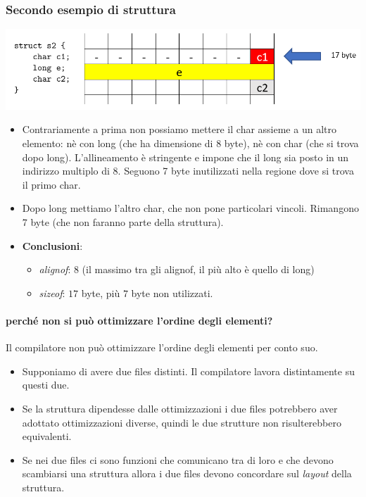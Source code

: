 			\subsubsection{Secondo esempio di struttura}
			\begin{center}
				\includegraphics[scale=0.80]{img/17.PNG}
			\end{center} 
			\begin{itemize}
				\item Contrariamente a prima non possiamo mettere il char assieme a un altro elemento: nè con long (che ha dimensione di 8 byte), nè con char (che si trova dopo long). L'allineamento è stringente e impone che il long sia posto in un indirizzo multiplo di 8. Seguono 7 byte inutilizzati nella regione dove si trova il primo char.
				\item Dopo long mettiamo l'altro char, che non pone particolari vincoli. Rimangono 7 byte (che non faranno parte della struttura).
				\item \textbf{Conclusioni}:\begin{itemize}
					\item \emph{alignof}: $8$ (il massimo tra gli alignof, il più alto è quello di long)
					\item \emph{sizeof}: $17$ byte, più $7$ byte non utilizzati.
				\end{itemize}
			\end{itemize}
			
			\paragraph{perché non si può ottimizzare l'ordine degli elementi?} Il compilatore non può ottimizzare l'ordine degli elementi per conto suo. 
			\begin{itemize}
				\item Supponiamo di avere due files distinti. Il compilatore lavora distintamente su questi due. 
				\item Se la struttura dipendesse dalle ottimizzazioni i due files potrebbero aver adottato ottimizzazioni diverse, quindi le due strutture non risulterebbero equivalenti.
				\item Se nei due files ci sono funzioni che comunicano tra di loro e che devono scambiarsi una struttura allora i due files devono concordare sul \emph{layout} della struttura.
			\end{itemize}
			
